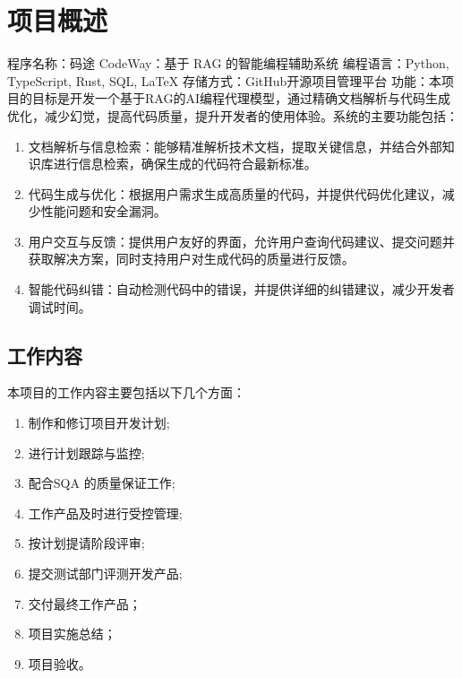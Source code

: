 \documentclass[
    report,     %
    oneside,    %
    UTF8,       %
    zihao=-4    %
]{config} %
\begin{document}
\section{项目概述}
程序名称：码途 CodeWay：基于 RAG 的智能编程辅助系统
编程语言：Python, TypeScript, Rust, SQL, LaTeX
存储方式：GitHub开源项目管理平台
功能：本项目的目标是开发一个基于RAG的AI编程代理模型，通过精确文档解析与代码生成优化，减少幻觉，提高代码质量，提升开发者的使用体验。系统的主要功能包括：
\begin{enumerate}
    \item 文档解析与信息检索：能够精准解析技术文档，提取关键信息，并结合外部知识库进行信息检索，确保生成的代码符合最新标准。
    \item 代码生成与优化：根据用户需求生成高质量的代码，并提供代码优化建议，减少性能问题和安全漏洞。
    \item 用户交互与反馈：提供用户友好的界面，允许用户查询代码建议、提交问题并获取解决方案，同时支持用户对生成代码的质量进行反馈。
    \item 智能代码纠错：自动检测代码中的错误，并提供详细的纠错建议，减少开发者调试时间。
\end{enumerate}

\subsection{工作内容}
本项目的工作内容主要包括以下几个方面：
\begin{enumerate}
    \item 制作和修订项目开发计划;
    \item 进行计划跟踪与监控;
    \item 配合SQA 的质量保证工作;
    \item 工作产品及时进行受控管理;
    \item 按计划提请阶段评审;
    \item 提交测试部门评测开发产品;
    \item 交付最终工作产品；
    \item 项目实施总结；
    \item 项目验收。
\end{enumerate}
\end{document}
